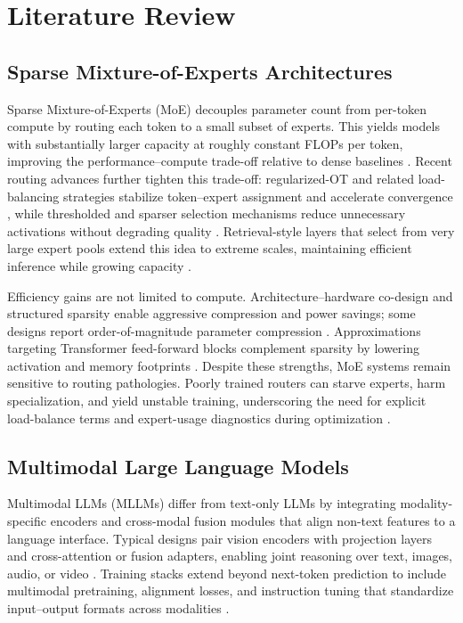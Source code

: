 \documentclass[11pt,a4paper]{article}
\begin{document}
\section{Literature Review}
\subsection{Sparse Mixture-of-Experts Architectures}
Sparse Mixture-of-Experts (MoE) decouples parameter count from per-token compute by routing each token to a small subset of experts. This yields models with substantially larger capacity at roughly constant FLOPs per token, improving the performance–compute trade-off relative to dense baselines \cite{he2024_million_experts,ijcnn2024_efficient_routing}. Recent routing advances further tighten this trade-off: regularized-OT and related load-balancing strategies stabilize token–expert assignment and accelerate convergence \cite{ijcnn2024_efficient_routing}, while thresholded and sparser selection mechanisms reduce unnecessary activations without degrading quality \cite{yang2024_sparser_selection}. Retrieval-style layers that select from very large expert pools extend this idea to extreme scales, maintaining efficient inference while growing capacity \cite{he2024_million_experts}.

Efficiency gains are not limited to compute. Architecture–hardware co-design and structured sparsity enable aggressive compression and power savings; some designs report order-of-magnitude parameter compression \cite{li2018_resource_aware}. Approximations targeting Transformer feed-forward blocks complement sparsity by lowering activation and memory footprints \cite{csordas2023_approx2ffn}. Despite these strengths, MoE systems remain sensitive to routing pathologies. Poorly trained routers can starve experts, harm specialization, and yield unstable training, underscoring the need for explicit load-balance terms and expert-usage diagnostics during optimization \cite{ijcnn2024_efficient_routing,yang2024_sparser_selection}.

\subsection{Multimodal Large Language Models}
Multimodal LLMs (MLLMs) differ from text-only LLMs by integrating modality-specific encoders and cross-modal fusion modules that align non-text features to a language interface. Typical designs pair vision encoders with projection layers and cross-attention or fusion adapters, enabling joint reasoning over text, images, audio, or video \cite{carolan2024_review_mmlm,bai2024_revolution_mllm}. Training stacks extend beyond next-token prediction to include multimodal pretraining, alignment losses, and instruction tuning that standardize input–output formats across modalities \cite{carolan2024_review_mmlm,gargbas2023_performance_mllm,niu2024_data_centric_mllm}.
\end{document}
